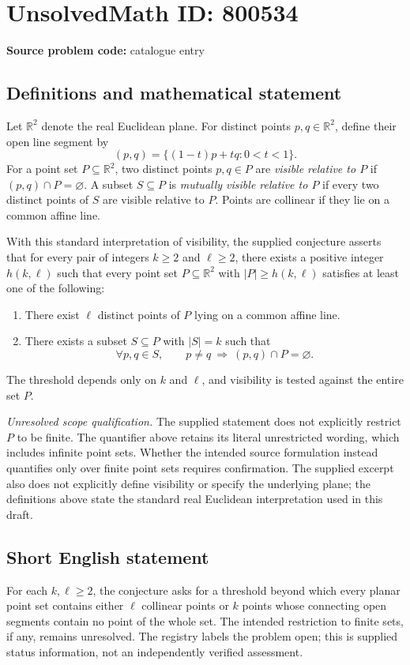 \documentclass[11pt]{article}
\newcommand{\R}{\mathbb{R}}
\begin{document}
\section*{UnsolvedMath ID: 800534}
\textbf{Source problem code:} catalogue entry
\subsection{Definitions and mathematical statement}
Let \(\R^2\) denote the real Euclidean plane. For distinct points \(p,q\in\R^2\), define their open line segment by
\[
(p,q)=\{(1-t)p+tq:0<t<1\}.
\]
For a point set \(P\subseteq\R^2\), two distinct points \(p,q\in P\) are \emph{visible relative to \(P\)} if \((p,q)\cap P=\varnothing\). A subset \(S\subseteq P\) is \emph{mutually visible relative to \(P\)} if every two distinct points of \(S\) are visible relative to \(P\). Points are collinear if they lie on a common affine line.

With this standard interpretation of visibility, the supplied conjecture asserts that for every pair of integers \(k\geq2\) and \(\ell\geq2\), there exists a positive integer \(h(k,\ell)\) such that every point set \(P\subseteq\R^2\) with \(|P|\geq h(k,\ell)\) satisfies at least one of the following:
\begin{enumerate}
\item There exist \(\ell\) distinct points of \(P\) lying on a common affine line.
\item There exists a subset \(S\subseteq P\) with \(|S|=k\) such that
\[
\forall p,q\in S,\qquad p\ne q\ \Longrightarrow\ (p,q)\cap P=\varnothing.
\]
\end{enumerate}
The threshold depends only on \(k\) and \(\ell\), and visibility is tested against the entire set \(P\).

\textit{Unresolved scope qualification.} The supplied statement does not explicitly restrict \(P\) to be finite. The quantifier above retains its literal unrestricted wording, which includes infinite point sets. Whether the intended source formulation instead quantifies only over finite point sets requires confirmation. The supplied excerpt also does not explicitly define visibility or specify the underlying plane; the definitions above state the standard real Euclidean interpretation used in this draft.
\subsection{Short English statement}
For each \(k,\ell\geq2\), the conjecture asks for a threshold beyond which every planar point set contains either \(\ell\) collinear points or \(k\) points whose connecting open segments contain no point of the whole set. The intended restriction to finite sets, if any, remains unresolved. The registry labels the problem open; this is supplied status information, not an independently verified assessment.
\end{document}
